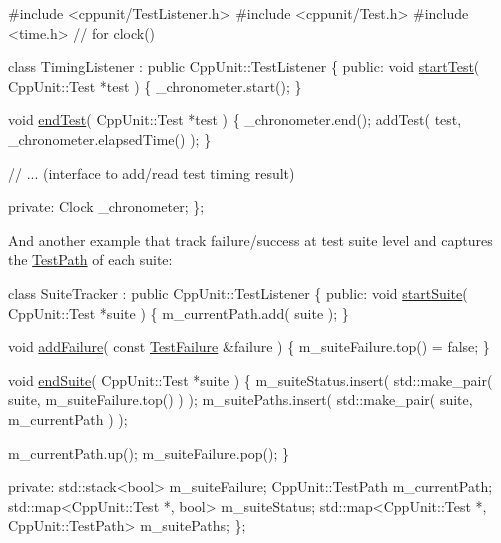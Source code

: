 \begin{DoxyCode}
\textcolor{preprocessor}{#include <cppunit/TestListener.h>}
\textcolor{preprocessor}{#include <cppunit/Test.h>}
\textcolor{preprocessor}{#include <time.h>}    \textcolor{comment}{// for clock()}

\textcolor{keyword}{class }TimingListener : \textcolor{keyword}{public} CppUnit::TestListener
\{
\textcolor{keyword}{public}:
  \textcolor{keywordtype}{void} \hyperlink{class_test_listener_a5546d4420e7412234915113b1ea5ad77}{startTest}( CppUnit::Test *test )
  \{
    \_chronometer.start();
  \}
 
  \textcolor{keywordtype}{void} \hyperlink{class_test_listener_ae8ccd0f55dd9aa7eafded05ba14f9ac6}{endTest}( CppUnit::Test *test )
  \{
    \_chronometer.end();
    addTest( test, \_chronometer.elapsedTime() );
  \}

  \textcolor{comment}{// ... (interface to add/read test timing result)}

\textcolor{keyword}{private}:
  Clock \_chronometer;
\};
\end{DoxyCode}


And another example that track failure/success at test suite level and captures the \hyperlink{class_test_path}{Test\+Path} of each suite\+: 
\begin{DoxyCode}
\textcolor{keyword}{class }SuiteTracker : \textcolor{keyword}{public} CppUnit::TestListener
\{
\textcolor{keyword}{public}:
  \textcolor{keywordtype}{void} \hyperlink{class_test_listener_a2360ebfccfa39f75bdc43948d5d1d2e7}{startSuite}( CppUnit::Test *suite )
  \{
    m\_currentPath.add( suite );
  \}
  
  \textcolor{keywordtype}{void} \hyperlink{class_test_listener_a103216a5814c907f7b752b969477e765}{addFailure}( \textcolor{keyword}{const} \hyperlink{class_test_failure}{TestFailure} &failure )
  \{
    m\_suiteFailure.top() = \textcolor{keyword}{false};
  \}

  \textcolor{keywordtype}{void} \hyperlink{class_test_listener_ad49e5589681732a1faff8fca5cbe61f5}{endSuite}( CppUnit::Test *suite )
  \{
    m\_suiteStatus.insert( std::make\_pair( suite, m\_suiteFailure.top() ) );
    m\_suitePaths.insert( std::make\_pair( suite, m\_currentPath ) );

    m\_currentPath.up();
    m\_suiteFailure.pop();
  \}

\textcolor{keyword}{private}:
  std::stack<bool> m\_suiteFailure;
  CppUnit::TestPath m\_currentPath;
  std::map<CppUnit::Test *, bool> m\_suiteStatus;
  std::map<CppUnit::Test *, CppUnit::TestPath> m\_suitePaths;
\};
\end{DoxyCode}


